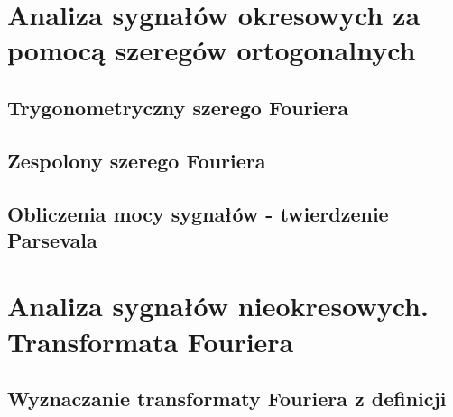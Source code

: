 \documentclass[a4paper,11pt]{LambBook} %
\begin{document}
\chapter{Analiza sygnałów okresowych za pomocą szeregów ortogonalnych}
\section{Trygonometryczny szerego Fouriera}
\section{Zespolony szerego Fouriera}
\section{Obliczenia mocy sygnałów - twierdzenie Parsevala}
\chapter{Analiza sygnałów nieokresowych. Transformata Fouriera}
\section{Wyznaczanie transformaty Fouriera z definicji}
\end{document}
